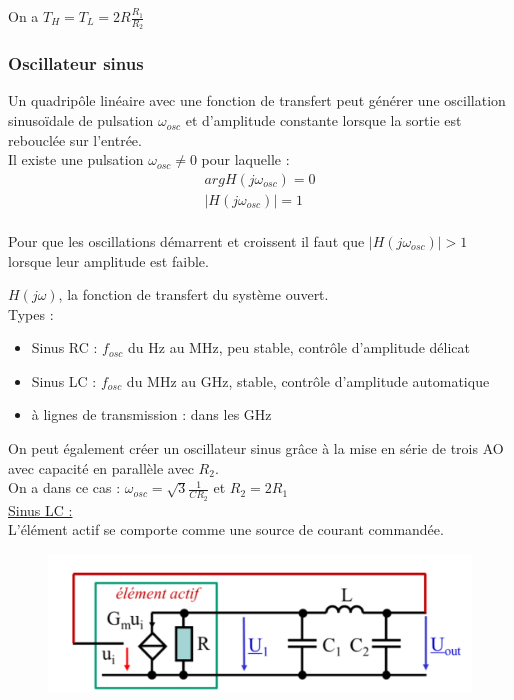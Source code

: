 \documentclass[../main.tex]{subfiles}
\begin{document}
On a $T_H = T_L = 2R \frac{R_1}{R_2}$\\

\subsubsection{Oscillateur sinus}
Un quadripôle linéaire avec une fonction de transfert peut générer une oscillation sinusoïdale de pulsation $\omega_{osc}$ et d'amplitude constante lorsque la sortie est rebouclée sur l'entrée.\\

Il existe une pulsation $\omega_{osc} \neq 0$ pour laquelle : \begin{equation}
    \begin{gathered}
        arg H(j\omega_{osc}) = 0\\
        \lvert H(j\omega_{osc})\rvert = 1\\
    \end{gathered}
\end{equation}

Pour que les oscillations démarrent et croissent il faut que $\lvert H(j\omega_{osc})\rvert >1$ lorsque leur amplitude est faible.

\warning $H(j\omega)$, la fonction de transfert du système ouvert.\\

Types : \begin{itemize}
    \item Sinus RC : $f_{osc}$ du Hz au MHz, peu stable, contrôle d'amplitude délicat\\
    \item Sinus LC : $f_{osc}$ du MHz au GHz, stable, contrôle d'amplitude automatique\\
    \item à lignes de transmission : dans les GHz\\
\end{itemize}

On peut également créer un oscillateur sinus grâce à la mise en série de trois AO avec capacité en parallèle avec $R_2$.\\
On a dans ce cas : $\omega_{osc} = \sqrt{3}\frac{1}{CR_2}$ et $R_2=2R_1$\\

\quad \underline{Sinus LC :}\\
L'élément actif se comporte comme une source de courant commandée.\\

\begin{figure}[hbt!]
    \centering
    \includegraphics[width=.7\textwidth]{IMAGES/elec/IMG_0153.jpeg}
\end{figure}
\end{document}

